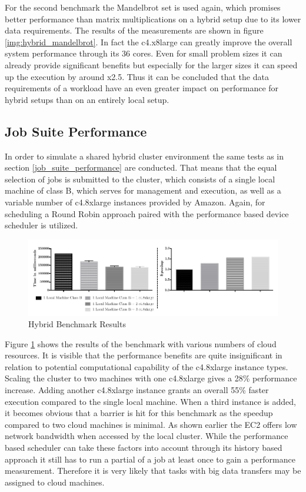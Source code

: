 For the second benchmark the Mandelbrot set is used again, which promises better performance than matrix multiplications on a hybrid setup due to its lower data requirements. The results of the measurements are shown in figure \ref{img:hybrid_mandelbrot}. In fact the c4.x8large can greatly improve the overall system performance through its 36 cores. Even for small problem sizes it can already provide significant benefits but especially for the larger sizes it can speed up the execution by around x2.5. Thus it can be concluded that the data requirements of a workload have an even greater impact on performance for hybrid setups than on an entirely local setup.

\subsection{Job Suite Performance}

In order to simulate a shared hybrid cluster environment the same tests as in section \ref{job_suite_performance} are conducted. That means that the equal selection of jobs is submitted to the cluster, which consists of a single local machine of class B, which serves for management and execution, as well as a variable number of c4.8xlarge instances provided by Amazon. Again, for scheduling a Round Robin approach paired with the performance based device scheduler is utilized.

\begin{figure}[H]	
	\includegraphics[width=1.0\textwidth]{images/hybrid_full_benchmark_performance_based.pdf}
	\centering
	\caption{Hybrid Benchmark Results}
	\label{img:hybrid_benchmark_results}
\end{figure}

Figure \ref{img:hybrid_benchmark_results} shows the results of the benchmark with various numbers of cloud resources. It is visible that the performance benefits are quite insignificant in relation to potential computational capability of the c4.8xlarge instance types. Scaling the cluster to two machines with one c4.8xlarge gives a 28\% performance increase. Adding another c4.8xlarge instance grants an overall 55\% faster execution compared to the single local machine. When a third instance is added, it becomes obvious that a barrier is hit for this benchmark as the speedup compared to two cloud machines is minimal. As shown earlier the EC2 offers low network bandwidth when accessed by the local cluster. While the performance based scheduler can take these factors into account through its history based approach it still has to run a partial of a job at least once to gain a performance measurement. Therefore it is very likely that tasks with big data transfers may be assigned to cloud machines. 


